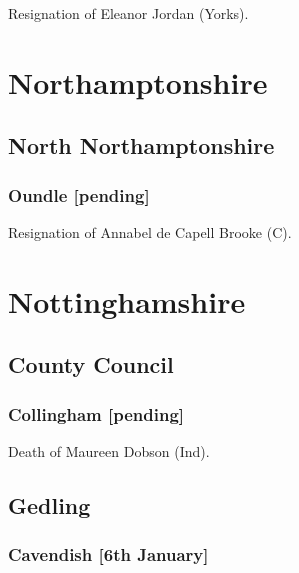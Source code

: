 \documentclass[a4paper,openany]{book}
\begin{document}
\begin{resultsiii}

Resignation of Eleanor Jordan (Yorks).

\section{Northamptonshire}

\subsection*{North Northamptonshire}

\subsubsection*{Oundle \hspace*{\fill}\nolinebreak[1]%
	\enspace\hspace*{\fill}
	[pending]}


Resignation of Annabel de Capell Brooke (C).

\section{Nottinghamshire}

\subsection*{County Council}

\subsubsection*{Collingham \hspace*{\fill}\nolinebreak[1]%
	\enspace\hspace*{\fill}
	[pending]}


Death of Maureen Dobson (Ind).

\subsection*{Gedling}

\subsubsection*{Cavendish \hspace*{\fill}\nolinebreak[1]%
	\enspace\hspace*{\fill}
	[6th January]}


\end{resultsiii}
\end{document}
